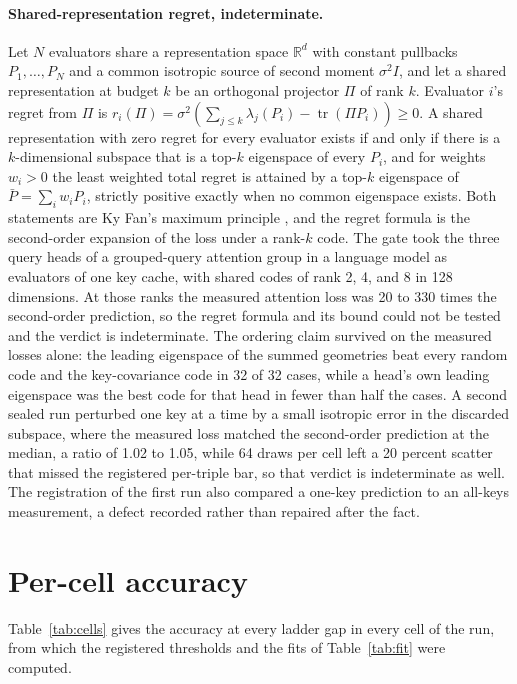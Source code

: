 \documentclass{article}
\theoremstyle{definition}
\theoremstyle{remark}
\newcommand{\R}{\mathbb{R}}
\newcommand{\tr}{\operatorname{tr}}
\begin{document}
\paragraph{Shared-representation regret, indeterminate.}
Let $N$ evaluators share a representation space $\R^{d}$ with constant pullbacks $P_{1},\dots,P_{N}$ and a common isotropic source of second moment $\sigma^{2}I$, and let a shared representation at budget $k$ be an orthogonal projector $\Pi$ of rank $k$.
Evaluator $i$'s regret from $\Pi$ is $r_{i}(\Pi)=\sigma^{2}(\sum_{j\le k}\lambda_{j}(P_{i})-\tr(\Pi P_{i}))\ge0$.
A shared representation with zero regret for every evaluator exists if and only if there is a $k$-dimensional subspace that is a top-$k$ eigenspace of every $P_{i}$, and for weights $w_{i}>0$ the least weighted total regret is attained by a top-$k$ eigenspace of $\bar P=\sum_{i}w_{i}P_{i}$, strictly positive exactly when no common eigenspace exists.
Both statements are Ky Fan's maximum principle \citep{fan1949}, and the regret formula is the second-order expansion of the loss under a rank-$k$ code.
The gate took the three query heads of a grouped-query attention group in a language model as evaluators of one key cache, with shared codes of rank 2, 4, and 8 in 128 dimensions.
At those ranks the measured attention loss was 20 to 330 times the second-order prediction, so the regret formula and its bound could not be tested and the verdict is indeterminate.
The ordering claim survived on the measured losses alone: the leading eigenspace of the summed geometries beat every random code and the key-covariance code in 32 of 32 cases, while a head's own leading eigenspace was the best code for that head in fewer than half the cases.
A second sealed run perturbed one key at a time by a small isotropic error in the discarded subspace, where the measured loss matched the second-order prediction at the median, a ratio of 1.02 to 1.05, while 64 draws per cell left a 20 percent scatter that missed the registered per-triple bar, so that verdict is indeterminate as well.
The registration of the first run also compared a one-key prediction to an all-keys measurement, a defect recorded rather than repaired after the fact.

\section{Per-cell accuracy}
\label{app:cells}

Table~\ref{tab:cells} gives the accuracy at every ladder gap in every cell of the run, from which the registered thresholds and the fits of Table~\ref{tab:fit} were computed.
\end{document}
